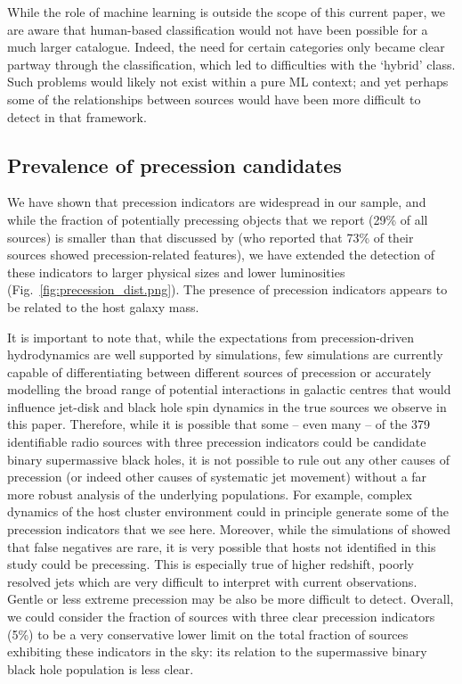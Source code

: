 \documentclass{aa}
\begin{document}
While the role of machine learning is outside the scope of this current paper, we are aware that human-based classification would not have been possible for a much larger catalogue. Indeed, the need for certain categories only became clear partway through the classification, which led to difficulties with the `hybrid' class. Such problems would likely not exist within a pure ML context; and yet perhaps some of the relationships between sources would have been more difficult to detect in that framework.

\subsection{Prevalence of precession candidates}

We have shown that precession indicators are widespread in our sample, and while the fraction of potentially precessing objects that we report (29\% of all sources) is smaller than that discussed by \cite{krause18} (who reported that 73\% of their sources showed precession-related features), we have extended the detection of these indicators to larger physical sizes and lower luminosities (Fig.\ \ref{fig:precession_dist.png}). The presence of precession indicators appears to be related to the host galaxy mass.

It is important to note that, while the expectations from precession-driven hydrodynamics are well supported by simulations, few simulations are currently capable of differentiating between different sources of precession or accurately modelling the broad range of potential interactions in galactic centres that would influence jet-disk and black hole spin dynamics in the true sources we observe in this paper. Therefore, while it is possible that some -- even many -- of the 379 identifiable radio sources with three precession indicators could be candidate binary supermassive black holes, it is not possible to rule out any other causes of precession (or indeed other causes of systematic jet movement) without a far more robust analysis of the underlying populations. For example, complex dynamics of the host cluster environment \citep[e.g.][]{bourne21} could in principle generate some of the precession indicators that we see here. Moreover, while the simulations of \cite{horton20b} showed that false negatives are rare, it is very possible that hosts not identified in this study could be precessing. This is especially true of higher redshift, poorly resolved jets which are very difficult to interpret with current observations. Gentle or less extreme precession may be also be more difficult to detect. Overall, we could consider the fraction of sources with three clear precession indicators (5\%) to be a very conservative lower limit on the total fraction of sources exhibiting these indicators in the sky: its relation to the supermassive binary black hole population is less clear.
\end{document}
